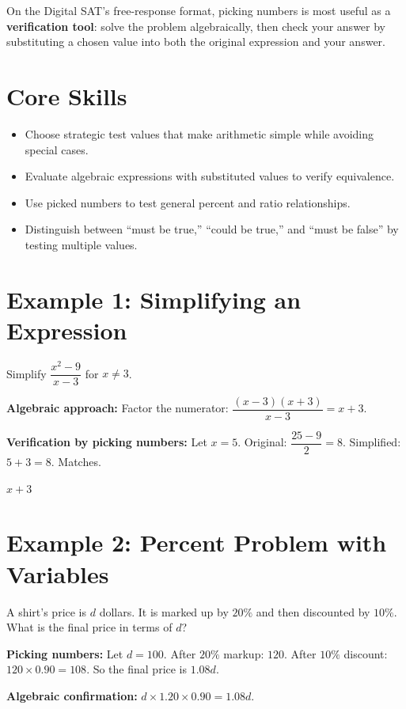 \documentclass[14pt]{extarticle}
\begin{document}
On the Digital SAT's free-response format, picking numbers is most useful as a \textbf{verification tool}: solve the problem algebraically, then check your answer by substituting a chosen value into both the original expression and your answer.

\section*{Core Skills}
\begin{itemize}
  \item Choose strategic test values that make arithmetic simple while avoiding special cases.
  \item Evaluate algebraic expressions with substituted values to verify equivalence.
  \item Use picked numbers to test general percent and ratio relationships.
  \item Distinguish between ``must be true,'' ``could be true,'' and ``must be false'' by testing multiple values.
\end{itemize}

\section*{Example 1: Simplifying an Expression}

Simplify \(\dfrac{x^2 - 9}{x - 3}\) for \(x \neq 3\).

\textbf{Algebraic approach:} Factor the numerator: \(\dfrac{(x-3)(x+3)}{x-3} = x + 3\).

\textbf{Verification by picking numbers:} Let \(x = 5\). Original: \(\dfrac{25 - 9}{2} = 8\). Simplified: \(5 + 3 = 8\). Matches.

\(\boxed{x + 3}\)

\section*{Example 2: Percent Problem with Variables}

A shirt's price is \(d\) dollars. It is marked up by \(20\%\) and then discounted by \(10\%\). What is the final price in terms of \(d\)?

\textbf{Picking numbers:} Let \(d = 100\). After \(20\%\) markup: \(120\). After \(10\%\) discount: \(120 \times 0.90 = 108\). So the final price is \(1.08d\).

\textbf{Algebraic confirmation:} \(d \times 1.20 \times 0.90 = 1.08d\).
\end{document}
